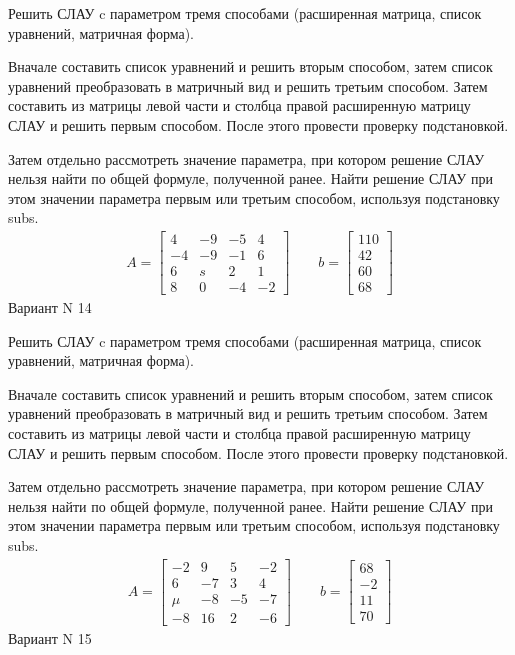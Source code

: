 \documentclass[11pt]{report}
\begin{document}
Решить СЛАУ c параметром тремя способами (расширенная матрица, список уравнений, матричная форма).

Вначале составить список уравнений и решить вторым способом,
затем список уравнений преобразовать в матричный вид и решить третьим способом.
Затем составить из матрицы левой части и столбца правой расширенную матрицу СЛАУ и решить первым способом.
После этого провести проверку подстановкой.

Затем отдельно рассмотреть значение параметра, при котором решение СЛАУ нельзя найти по общей формуле,
полученной ранее.
Найти решение СЛАУ при этом значении параметра первым или третьим способом, используя подстановку subs.
\begin{align*}
    A = \left[\begin{matrix}4 & -9 & -5 & 4\\-4 & -9 & -1 & 6\\6 & s & 2 & 1\\8 & 0 & -4 & -2\end{matrix}\right]
\qquad b = \left[\begin{matrix}110\\42\\60\\68\end{matrix}\right]
\end{align*}
\newpage
Вариант N 14


Решить СЛАУ c параметром тремя способами (расширенная матрица, список уравнений, матричная форма).

Вначале составить список уравнений и решить вторым способом,
затем список уравнений преобразовать в матричный вид и решить третьим способом.
Затем составить из матрицы левой части и столбца правой расширенную матрицу СЛАУ и решить первым способом.
После этого провести проверку подстановкой.

Затем отдельно рассмотреть значение параметра, при котором решение СЛАУ нельзя найти по общей формуле,
полученной ранее.
Найти решение СЛАУ при этом значении параметра первым или третьим способом, используя подстановку subs.
\begin{align*}
    A = \left[\begin{matrix}-2 & 9 & 5 & -2\\6 & -7 & 3 & 4\\\mu & -8 & -5 & -7\\-8 & 16 & 2 & -6\end{matrix}\right]
\qquad b = \left[\begin{matrix}68\\-2\\11\\70\end{matrix}\right]
\end{align*}
\newpage
Вариант N 15
\end{document}

